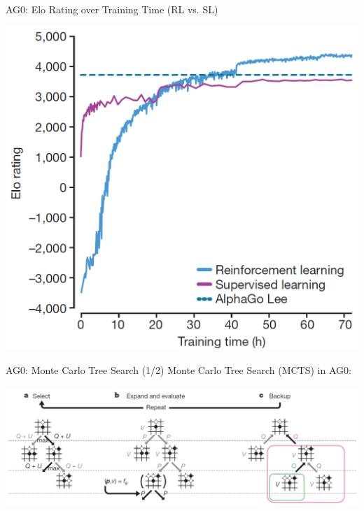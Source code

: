 \documentclass{beamer}
\begin{document}
{    \begin{frame}{AG0: Elo Rating over Training Time (RL vs. SL)}
      \begin{center}
        \includegraphics[height=.9\textheight]{../img/AG0-paper/training-time-vs-elo.png}
      \end{center}
    \end{frame}

    \begin{frame}{AG0: Monte Carlo Tree Search (1/2)}
      Monte Carlo Tree Search (MCTS) in AG0:
      \pause

      \begin{center}
        \includegraphics[width=\textwidth]{../img/AG0-paper/MCTS-1.png}
      \end{center}
    \end{frame}

}
\end{document}
